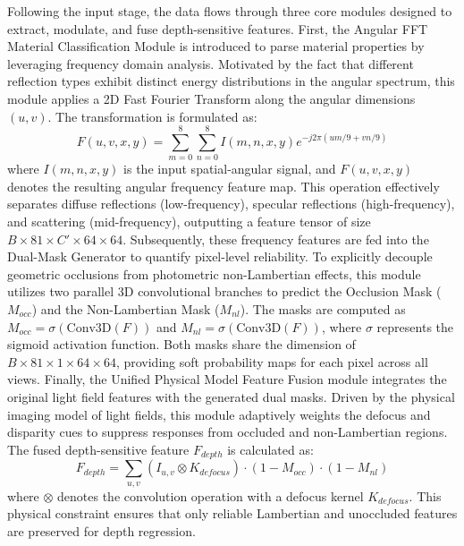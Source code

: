 \documentclass[lettersize,journal]{IEEEtran}
\begin{document}
Following the input stage, the data flows through three core modules designed to extract, modulate, and fuse depth-sensitive features. First, the Angular FFT Material Classification Module is introduced to parse material properties by leveraging frequency domain analysis. Motivated by the fact that different reflection types exhibit distinct energy distributions in the angular spectrum, this module applies a 2D Fast Fourier Transform along the angular dimensions $(u, v)$. The transformation is formulated as:
\begin{equation}
\label{eq:eq1}
F(u,v,x,y) = \sum_{m=0}^{8}\sum_{n=0}^{8} I(m,n,x,y) e^{-j 2\pi (um/9 + vn/9)}
\end{equation}
where $I(m,n,x,y)$ is the input spatial-angular signal, and $F(u,v,x,y)$ denotes the resulting angular frequency feature map. This operation effectively separates diffuse reflections (low-frequency), specular reflections (high-frequency), and scattering (mid-frequency), outputting a feature tensor of size $B \times 81 \times C' \times 64 \times 64$. Subsequently, these frequency features are fed into the Dual-Mask Generator to quantify pixel-level reliability. To explicitly decouple geometric occlusions from photometric non-Lambertian effects, this module utilizes two parallel 3D convolutional branches to predict the Occlusion Mask ($M_{occ}$) and the Non-Lambertian Mask ($M_{nl}$). The masks are computed as $M_{occ} = \sigma(\text{Conv3D}(F))$ and $M_{nl} = \sigma(\text{Conv3D}(F))$, where $\sigma$ represents the sigmoid activation function. Both masks share the dimension of $B \times 81 \times 1 \times 64 \times 64$, providing soft probability maps for each pixel across all views. Finally, the Unified Physical Model Feature Fusion module integrates the original light field features with the generated dual masks. Driven by the physical imaging model of light fields, this module adaptively weights the defocus and disparity cues to suppress responses from occluded and non-Lambertian regions. The fused depth-sensitive feature $F_{depth}$ is calculated as:
\begin{equation}
\label{eq:eq2}
F_{depth} = \sum_{u,v} (I_{u,v} \otimes K_{defocus}) \cdot (1 - M_{occ}) \cdot (1 - M_{nl})
\end{equation}
where $\otimes$ denotes the convolution operation with a defocus kernel $K_{defocus}$. This physical constraint ensures that only reliable Lambertian and unoccluded features are preserved for depth regression.
\end{document}
